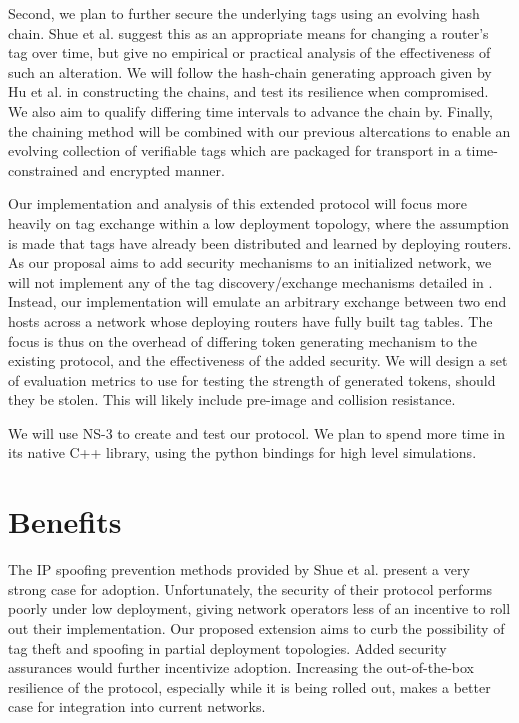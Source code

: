 \documentclass[12pt]{article} %
\begin{document}
	Second, we plan to further secure the underlying tags using an evolving hash chain. Shue et al. suggest this as an appropriate means for changing a router's tag over time, but give no empirical or practical analysis of the effectiveness of such an alteration. We will follow the hash-chain generating approach given by Hu et al. \cite{Hu} in constructing the chains, and test its resilience when compromised. We also aim to qualify differing time intervals to advance the chain by. Finally, the chaining method will be combined with our previous altercations to enable an evolving collection of verifiable tags which are packaged for transport in a time-constrained and encrypted manner.

	Our implementation and analysis of this extended protocol will focus more heavily on tag exchange within a low deployment topology, where the assumption is made that tags have already been distributed and learned by deploying routers. As our proposal aims to add security mechanisms to an initialized network, we will not implement any of the tag discovery/exchange mechanisms detailed in \cite{Shue20081567}. Instead, our implementation will emulate an arbitrary exchange between two end hosts across a network whose deploying routers have fully built tag tables. The focus is thus on the overhead of differing token generating mechanism to the existing protocol, and the effectiveness of the added security. We will design a set of evaluation metrics to use for testing the strength of generated tokens, should they be stolen. This will likely include pre-image and collision resistance.

	We will use NS-3 to create and test our protocol. We plan to spend more time in its native C++ library, using the python bindings for high level simulations. 

\section{Benefits}

	The IP spoofing prevention methods provided by Shue et al. present a very strong case for adoption. Unfortunately, the security of their protocol performs poorly under low deployment, giving network operators less of an incentive to roll out their implementation. Our proposed extension aims to curb the possibility of tag theft and spoofing in partial deployment topologies. Added security assurances would further incentivize adoption. Increasing the out-of-the-box resilience of the protocol, especially while it is being rolled out, makes a better case for integration into current networks. 
\end{document}
